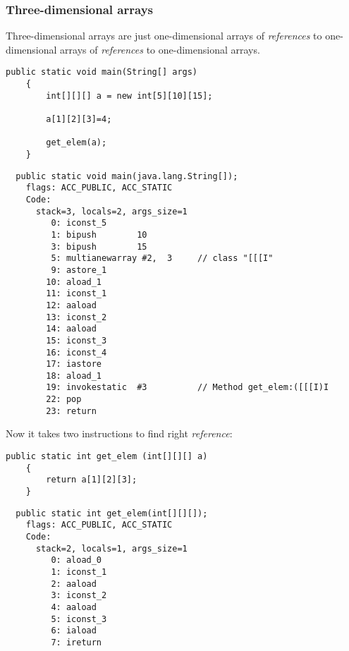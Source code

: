 \subsubsection{Three-dimensional arrays}

Three-dimensional arrays are just one-dimensional arrays of \emph{references} 
to one-dimensional arrays of \emph{references} to one-dimensional arrays.

\begin{lstlisting}[style=customjava]
	public static void main(String[] args)
	{
		int[][][] a = new int[5][10][15];

		a[1][2][3]=4;

		get_elem(a);
	}
\end{lstlisting}

\begin{lstlisting}
  public static void main(java.lang.String[]);
    flags: ACC_PUBLIC, ACC_STATIC
    Code:
      stack=3, locals=2, args_size=1
         0: iconst_5      
         1: bipush        10
         3: bipush        15
         5: multianewarray #2,  3     // class "[[[I"
         9: astore_1      
        10: aload_1       
        11: iconst_1      
        12: aaload        
        13: iconst_2      
        14: aaload        
        15: iconst_3      
        16: iconst_4      
        17: iastore       
        18: aload_1       
        19: invokestatic  #3          // Method get_elem:([[[I)I
        22: pop           
        23: return        
\end{lstlisting}

Now it takes two  instructions to find right \emph{reference}:


\begin{lstlisting}[style=customjava]
	public static int get_elem (int[][][] a)
	{
		return a[1][2][3];
	}
\end{lstlisting}

\begin{lstlisting}
  public static int get_elem(int[][][]);
    flags: ACC_PUBLIC, ACC_STATIC
    Code:
      stack=2, locals=1, args_size=1
         0: aload_0       
         1: iconst_1      
         2: aaload        
         3: iconst_2      
         4: aaload        
         5: iconst_3      
         6: iaload        
         7: ireturn       
\end{lstlisting}
